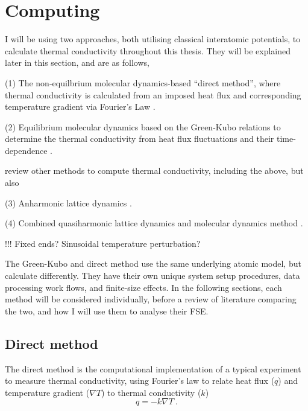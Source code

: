 \pagebreak
















\section{Computing \tc}

I will be using two approaches, both utilising classical interatomic potentials, to calculate thermal conductivity throughout this thesis. They will be explained later in this section, and are as follows,

(1) The non-equilbrium molecular dynamics-based ``direct method'', where thermal conductivity is calculated from an imposed heat flux and corresponding temperature gradient via Fourier's Law \citep{Muller-Plathe1997,Nieto-Draghi2013}.

(2) Equilibrium molecular dynamics based on the Green-Kubo relations to determine the thermal conductivity from heat flux fluctuations and their time-dependence \citep{Green1954,Kubo1957,Kubo1966,Schelling2002}. 


\citet{Stackhouse2010} review other methods to compute thermal conductivity, including the above, but also

(3) Anharmonic lattice dynamics \citep{Tang2009}. %

(4) Combined quasiharmonic lattice dynamics and molecular dynamics method \citep{DeKoker2009}.

!!! Fixed ends? Sinusoidal temperature perturbation?

The Green-Kubo and direct method use the same underlying atomic model, but calculate \tcs differently. They have their own unique system setup procedures, data processing work flows, and finite-size effects. In the following sections, each method will be considered individually, before a review of literature comparing the two, and how I will use them to analyse their FSE.



\subsection{Direct method}
The direct method is the computational implementation of a typical experiment to measure thermal conductivity, using Fourier's law to relate heat flux ($q$) and temperature gradient ($\nabla{T}$) to thermal conductivity ($k$)
%
\begin{equation}
q=-k \nabla{T}\ . 
\label{fourier}
\end{equation}

